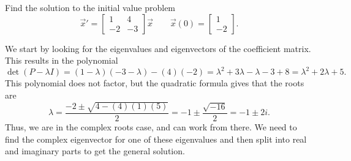 \documentclass{ximera}
\begin{document}
\begin{example}
    Find the solution to the initial value problem
    \begin{equation*}
        \vec{x}' = 
        \begin{bmatrix} 
            1 & 4 \\ 
            -2 & -3 
        \end{bmatrix}
        \vec{x} \qquad \vec{x}(0) = 
        \begin{bmatrix} 
            1 \\ 
            -2 
        \end{bmatrix}.
    \end{equation*}
\end{example}

\begin{exampleSol}
    We start by looking for the eigenvalues and eigenvectors of the coefficient matrix. This results in the polynomial
    \begin{equation*}
        \det(P - \lambda I) = (1-\lambda)(-3-\lambda) - (4)(-2) = \lambda^2 + 3\lambda - \lambda  - 3 + 8 = \lambda^2 + 2\lambda + 5.
    \end{equation*}
    This polynomial does not factor, but the quadratic formula gives that the roots are
    \begin{equation*}
        \lambda = \frac{-2 \pm \sqrt{4 - (4)(1)(5)}}{2} = -1 \pm \frac{\sqrt{-16}}{2} = -1 \pm 2i.
    \end{equation*}
    Thus, we are in the complex roots case, and can work from there. We need to find the complex eigenvector for one of these eigenvalues and then split into real and imaginary parts to get the general solution. 
    

\end{exampleSol}
\end{document}
